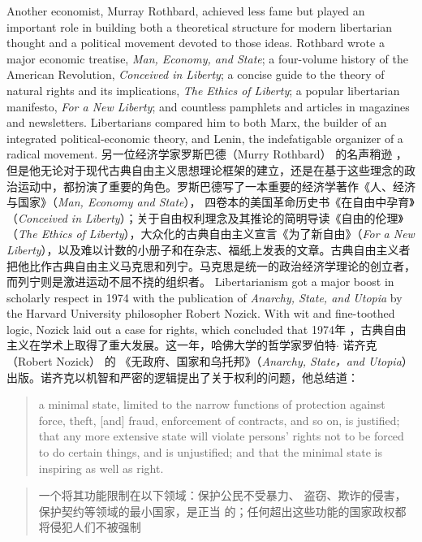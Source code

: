 \begin{paracol}{2}
\switchcolumn*
Another economist, Murray Rothbard, achieved less fame
but played an important role in building both a theoretical
structure for modern libertarian thought and a political movement devoted to those ideas. Rothbard wrote a major economic
treatise, \textit{Man, Economy, and State}; a four-volume history of the
American Revolution, \textit{Conceived in Liberty}; a concise guide to the
theory of natural rights and its implications, \textit{The Ethics of Liberty}; a popular libertarian manifesto, \textit{For a New Liberty}; and countless pamphlets and articles in magazines and newsletters.
Libertarians compared him to both Marx, the builder of an integrated political-economic theory, and Lenin, the indefatigable organizer of a radical movement.
\switchcolumn
另一位经济学家罗斯巴德（Murry Rothbard） 的名声稍逊 ，但是他无论对于现代古典自由主义思想理论框架的建立，还是在基于这些理念的政治运动中，都扮演了重要的角色。罗斯巴德写了一本重要的经济学著作《人、经济与国家》（\textit{Man, Economy and State}）， 四卷本的美国革命历史书《在自由中孕育》（\textit{Conceived in Liberty}）；关于自由权利理念及其推论的简明导读《自由的伦理》（\textit{The Ethics of Liberty}），大众化的古典自由主义宣言《为了新自由》（\textit{For a New Liberty}），以及难以计数的小册子和在杂志、福纸上发表的文章。古典自由主义者把他比作古典自由主义马克思和列宁。马克思是统一的政治经济学理论的创立者，而列宁则是激进运动不屈不挠的组织者。
\switchcolumn*
Libertarianism got a major boost in scholarly respect in 1974 with the publication of \textit{Anarchy, State, and Utopia} by the Harvard University philosopher Robert Nozick. With wit and fine-toothed logic, Nozick laid out a case for rights, which concluded that
\switchcolumn
1974年 ，古典自由主义在学术上取得了重大发展。这一年，哈佛大学的哲学家罗伯特$\cdot$ 诺齐克（Robert  Nozick） 的
《无政府、国家和乌托邦》（\textit{Anarchy, State，and Utopia}） 出版。诺齐克以机智和严密的逻辑提出了关于权利的问题，他总结道：
\switchcolumn*
\begin{quote}
a minimal state, limited to the narrow functions of protection
against force, theft, [and] fraud, enforcement of contracts, and so
on, is justified; that any more extensive state will violate persons' rights not to be forced to do certain things, and is unjustified;
and that the minimal state is inspiring as well as right.
\end{quote}
\switchcolumn
\begin{quote}
一个将其功能限制在以下领域：保护公民不受暴力、
盗窃、欺诈的侵害，保护契约等领域的最小国家，是正当
的；任何超出这些功能的国家政权都将侵犯人们不被强制

\end{quote}
\end{paracol}
